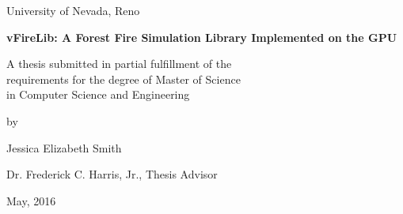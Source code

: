 \setcounter{page}{0}
\thispagestyle{empty}

\begin{center}
University of Nevada, Reno

\vfill


{\Large \bf vFireLib: A Forest Fire Simulation Library Implemented on the GPU
\\ \vspace{0.05in}}
\vfill

A thesis submitted in partial fulfillment of the\\
requirements for the degree of Master of Science\\
in Computer Science and Engineering

\vfill

by

\vspace{0.5in}

Jessica Elizabeth Smith

\vspace{0.5in}

Dr. Frederick C. Harris, Jr., Thesis Advisor

\vspace{0.5in}

May, 2016
\end{center}
